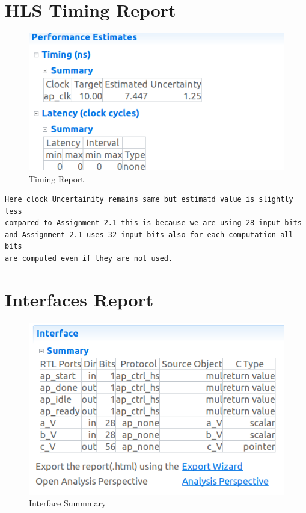 \documentclass{article}
\begin{document}
\section{HLS Timing Report}
\vspace{1cm}
\begin{figure}[h]
    \centering
\includegraphics[width=\columnwidth]{figs/Timing_Report.png}
    \caption{Timing Report}
    \label{fig:my_label}
\end{figure}

\begin{lstlisting}
Here clock Uncertainity remains same but estimatd value is slightly less
compared to Assignment 2.1 this is because we are using 28 input bits 
and Assignment 2.1 uses 32 input bits also for each computation all bits 
are computed even if they are not used.
\end{lstlisting}
\vspace{10cm}


\section{Interfaces Report}
\vspace{1cm}
\begin{figure}[h]
    \centering
\includegraphics[width=\columnwidth]{figs/interfaces.png}
    \caption{Interface Summmary}
    \label{fig:my_label}
\end{figure}
\vspace{5cm}
\end{document}
